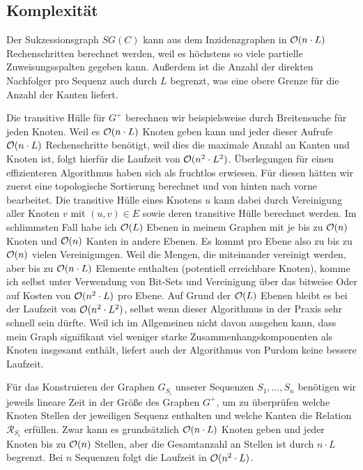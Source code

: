 \subsection{Komplexität}

Der Sukzessionsgraph $SG(C)$ kann aus dem Inzidenzgraphen in $\mathcal{O}(n\cdot L)$ Rechenschritten berechnet werden, weil es höchstens so viele partielle Zuweisungsspalten gegeben kann. Außerdem ist die Anzahl der direkten Nachfolger pro Sequenz auch durch $L$ begrenzt, was eine obere Grenze für die Anzahl der Kanten liefert.

Die transitive Hülle für $G^{+}$ berechnen wir beispielsweise durch Breitensuche für jeden Knoten. Weil es $\mathcal{O}(n\cdot L)$ Knoten geben kann und jeder dieser Aufrufe $\mathcal{O}(n\cdot L)$ Rechenschritte benötigt, weil dies die maximale Anzahl an Kanten und Knoten ist, folgt hierfür die Laufzeit von $\mathcal{O}(n^2\cdot L^2)$. Überlegungen für einen effizienteren Algorithmus haben sich als fruchtlos erwiesen. Für diesen hätten wir zuerst eine topologische Sortierung berechnet und von hinten nach vorne bearbeitet. Die transitive Hülle eines Knotens $u$ kann dabei durch Vereinigung aller Knoten $v$ mit $(u,v) \in E$ sowie deren transitive Hülle berechnet werden. Im schlimmsten Fall habe ich $\mathcal{O}(L)$ Ebenen in meinem Graphen mit je bis zu $\mathcal{O}(n)$ Knoten und $\mathcal{O}(n)$ Kanten in andere Ebenen. Es kommt pro Ebene also zu bis zu $\mathcal{O}(n)$ vielen Vereinigungen. Weil die Mengen, die miteinander vereinigt werden, aber bis zu $\mathcal{O}(n\cdot L)$ Elemente enthalten (potentiell erreichbare Knoten), komme ich selbst unter Verwendung von Bit-Sets und Vereinigung über das bitweise Oder auf Kosten von $\mathcal{O}(n^2\cdot L)$ pro Ebene. Auf Grund der $\mathcal{O}(L)$ Ebenen bleibt es bei der Laufzeit von $\mathcal{O}(n^2\cdot L^2)$, selbst wenn dieser Algorithmus in der Praxis sehr schnell sein dürfte. Weil ich im Allgemeinen nicht davon ausgehen kann, dass mein Graph signifikant viel weniger starke Zusammenhangskomponenten als Knoten insgesamt enthält, liefert auch der Algorithmus von Purdom keine bessere Laufzeit.

Für das Konstruieren der Graphen $G_{S_i}$ unserer Sequenzen $S_1, \dots, S_n$ benötigen wir jeweils lineare Zeit in der Größe des Graphen $G^{+}$, um zu überprüfen welche Knoten Stellen der jeweiligen Sequenz enthalten und welche Kanten die Relation $\mathcal{R}_{S_i}$ erfüllen. Zwar kann es grundsätzlich $\mathcal{O}(n\cdot L)$ Knoten geben und jeder Knoten bis zu $\mathcal{O}(n)$ Stellen, aber die Gesamtanzahl an Stellen ist durch $n\cdot L$ begrenzt. Bei $n$ Sequenzen folgt die Laufzeit in $\mathcal{O}(n^2\cdot L)$.

